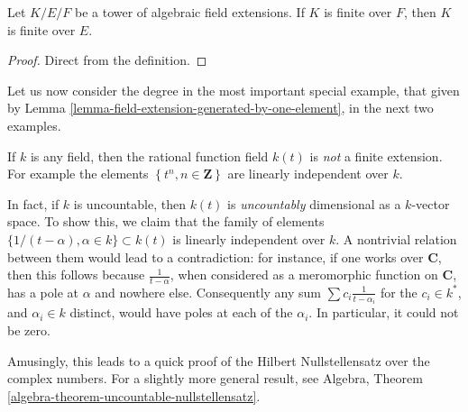 \begin{lemma}
\label{lemma-finite-goes-up}
Let $K/E/F$ be a tower of algebraic field extensions.
If $K$ is finite over $F$, then $K$ is finite over $E$.
\end{lemma}

\begin{proof}
Direct from the definition.
\end{proof}

\noindent
Let us now consider the degree in the most important special example, that
given by Lemma \ref{lemma-field-extension-generated-by-one-element}, in the
next two examples.

\begin{example}
\label{example-degree-rational-function-field}
If $k$ is any field, then the rational function field $k(t)$ is
{\it not} a finite extension. For example the elements
$\left\{t^n, n \in \mathbf{Z}\right\}$ are linearly independent over $k$.

\medskip\noindent
In fact, if $k$ is uncountable, then $k(t)$ is {\it uncountably} dimensional
as a $k$-vector space. To show this, we claim that the family of elements
$\{1/(t- \alpha), \alpha \in k\} \subset k(t)$ is linearly independent over
$k$. A nontrivial relation between them would lead to a contradiction: for
instance, if one works over $\mathbf{C}$, then this follows because
$\frac{1}{t-\alpha}$, when considered as a meromorphic function on
$\mathbf{C}$, has a pole at $\alpha$ and nowhere else.
Consequently any sum $\sum c_i \frac{1}{t - \alpha_i}$ for the $c_i \in k^*$,
and $\alpha_i \in k$ distinct, would have poles at each of the $\alpha_i$.
In particular, it could not be zero.

\medskip\noindent
Amusingly, this leads to a quick proof of the Hilbert Nullstellensatz over
the complex numbers. For a slightly more general result, see
Algebra, Theorem \ref{algebra-theorem-uncountable-nullstellensatz}. 
\end{example}

